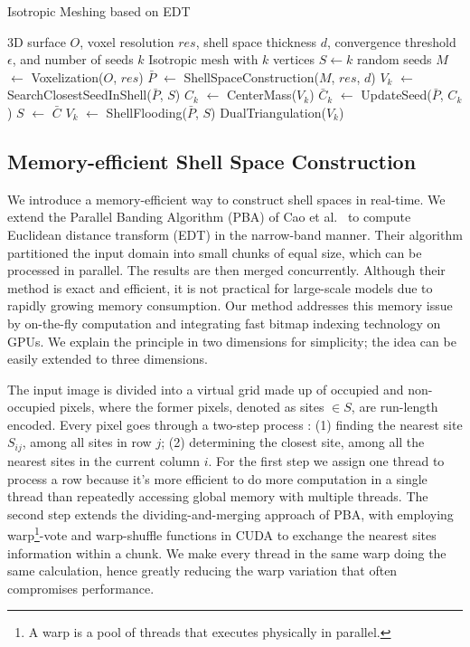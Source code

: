  \begin{algorithm}
  \caption{Isotropic Meshing based on EDT}\label{ALGORITHM:meshing}
  \renewcommand{\algorithmicrequire}{\textbf{Input:}}
  \renewcommand{\algorithmicensure}{\textbf{Output:}}
  \begin{algorithmic}[1]
  \Require 3D surface $O$, voxel resolution $res$, shell space thickness $d$, convergence threshold $\epsilon$, and number of seeds $k$
  \Ensure Isotropic mesh with $k$ vertices
  \State $S \gets k$ random seeds
  \State $M$ $\gets$ Voxelization($O$, $res$)
  \State $\bar{P}$ $\gets$ ShellSpaceConstruction($M$, $res$, $d$)
  \State $V_k$ $\gets$ SearchClosestSeedInShell($\bar{P}$, $S$)
  \State $C_k$ $\gets$ CenterMass($V_k$)
  \State $\bar{C}_k$ $\gets$ UpdateSeed($\bar{P}$, $C_k$)
  \State $S$ $\gets$ $\bar{C}$
  \EndWhile
  \State $V_k$ $\gets$ ShellFlooding($\bar{P}$, $S$)
  \Return DualTriangulation($V_k$)
  \end{algorithmic}
  \end{algorithm}

\vspace{-0.4cm}

\subsection{Memory-efficient Shell Space Construction}
\label{sub:Shell Space Computation}
  We introduce a memory-efficient way to construct shell spaces in real-time.
  We extend the Parallel Banding Algorithm (PBA) of Cao et al.~\cite{Cao:2010} to compute Euclidean distance transform (EDT) in the narrow-band manner.
  Their algorithm partitioned the input domain into small chunks of equal size, which can be processed in parallel.
  The results are then merged concurrently.
  Although their method is exact and efficient, it is not practical for large-scale models due to rapidly growing memory consumption.
  Our method addresses this memory issue by on-the-fly computation and integrating fast bitmap indexing technology on GPUs.
  We explain the principle in two dimensions for simplicity; the idea can be easily extended to three dimensions.

  The input image is divided into a virtual grid made up of occupied and non-occupied pixels,
  where the former pixels, denoted as sites $\in S$, are run-length encoded.
  Every pixel goes through a two-step process : (1) finding the nearest site $S_{ij}$, among all sites in row $j$;
  (2) determining the closest site, among all the nearest sites in the current column $i$.
  For the first step we assign one thread to process a row because it's more efficient to do more computation in a single thread
  than repeatedly accessing global memory with multiple threads.
  The second step extends the dividing-and-merging approach of PBA,
  with employing warp\footnote{A warp is a pool of threads that executes physically in parallel.}-vote and warp-shuffle functions in CUDA to exchange the nearest sites information within a chunk.
  We make every thread in the same warp doing the same calculation,
  hence greatly reducing the warp variation that often compromises performance.

